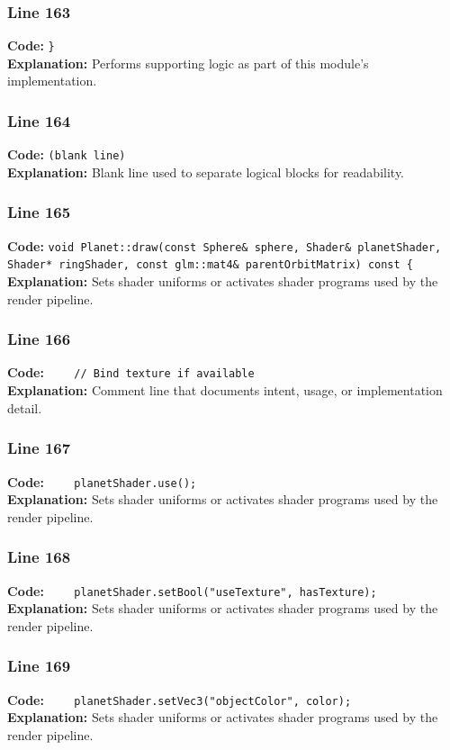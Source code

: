 \documentclass[11pt,a4paper]{article}
\begin{document}
\subsubsection*{Line 163}
\textbf{Code:} \verb|}|\\
\textbf{Explanation:} Performs supporting logic as part of this module's implementation.

\subsubsection*{Line 164}
\textbf{Code:} \texttt{(blank line)}\\
\textbf{Explanation:} Blank line used to separate logical blocks for readability.

\subsubsection*{Line 165}
\textbf{Code:} \verb|void Planet::draw(const Sphere& sphere, Shader& planetShader, Shader* ringShader, const glm::mat4& parentOrbitMatrix) const {|\\
\textbf{Explanation:} Sets shader uniforms or activates shader programs used by the render pipeline.

\subsubsection*{Line 166}
\textbf{Code:} \verb|    // Bind texture if available|\\
\textbf{Explanation:} Comment line that documents intent, usage, or implementation detail.

\subsubsection*{Line 167}
\textbf{Code:} \verb|    planetShader.use();|\\
\textbf{Explanation:} Sets shader uniforms or activates shader programs used by the render pipeline.

\subsubsection*{Line 168}
\textbf{Code:} \verb|    planetShader.setBool("useTexture", hasTexture);|\\
\textbf{Explanation:} Sets shader uniforms or activates shader programs used by the render pipeline.

\subsubsection*{Line 169}
\textbf{Code:} \verb|    planetShader.setVec3("objectColor", color);|\\
\textbf{Explanation:} Sets shader uniforms or activates shader programs used by the render pipeline.
\end{document}
